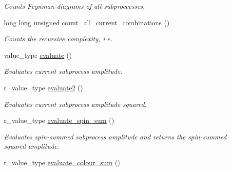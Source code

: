 \begin{DoxyCompactItemize}
\begin{DoxyCompactList}\small\item\em Counts Feynman diagrams of all subproccesses. \end{DoxyCompactList}\item 
long long unsigned \hyperlink{a00070_a92160db9f0d2e80d79f6927668224480}{count\-\_\-all\-\_\-current\-\_\-combinations} ()
\begin{DoxyCompactList}\small\item\em Counts the recursive complexity, i.\-e. \end{DoxyCompactList}\item 
\hypertarget{a00070_ae19da65c82df03b814f5ccabc994639b}{value\-\_\-type \hyperlink{a00070_ae19da65c82df03b814f5ccabc994639b}{evaluate} ()}\label{a00070_ae19da65c82df03b814f5ccabc994639b}

\begin{DoxyCompactList}\small\item\em Evaluates current subprocess amplitude. \end{DoxyCompactList}\item 
\hypertarget{a00070_a7147b8a2a31ea51584956656c8fba463}{r\-\_\-value\-\_\-type \hyperlink{a00070_a7147b8a2a31ea51584956656c8fba463}{evaluate2} ()}\label{a00070_a7147b8a2a31ea51584956656c8fba463}

\begin{DoxyCompactList}\small\item\em Evaluates current subprocess amplitude squared. \end{DoxyCompactList}\item 
\hypertarget{a00070_acbd9deb20158ae0e76b30a166063d576}{r\-\_\-value\-\_\-type \hyperlink{a00070_acbd9deb20158ae0e76b30a166063d576}{evaluate\-\_\-spin\-\_\-sum} ()}\label{a00070_acbd9deb20158ae0e76b30a166063d576}

\begin{DoxyCompactList}\small\item\em Evaluates spin-\/summed subprocess amplitude and returns the spin-\/summed squared amplitude. \end{DoxyCompactList}\item 
\hypertarget{a00070_aec23cda7c4ef2db43d987f2f2bb38c78}{r\-\_\-value\-\_\-type \hyperlink{a00070_aec23cda7c4ef2db43d987f2f2bb38c78}{evaluate\-\_\-colour\-\_\-sum} ()}\label{a00070_aec23cda7c4ef2db43d987f2f2bb38c78}


\end{DoxyCompactItemize}
